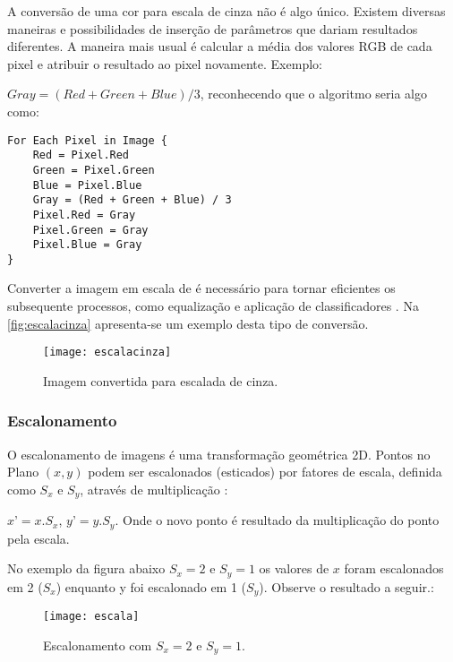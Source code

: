 A conversão de uma cor para escala de cinza não é algo único. Existem diversas maneiras e possibilidades de inserção de parâmetros que dariam resultados diferentes. A maneira mais usual é calcular a média dos valores RGB de cada pixel e atribuir o resultado ao pixel novamente. Exemplo:

$ Gray = (Red + Green + Blue) / 3 $, reconhecendo que o algoritmo seria algo como:

\begin{lstlisting}
For Each Pixel in Image {
	Red = Pixel.Red
	Green = Pixel.Green
	Blue = Pixel.Blue
	Gray = (Red + Green + Blue) / 3	
	Pixel.Red = Gray
	Pixel.Green = Gray
	Pixel.Blue = Gray
}
\end{lstlisting}



Converter a imagem em escala de é necessário para tornar eficientes os subsequente processos, como equalização e aplicação de classificadores \cite{drmathew_java_programming}. Na \autoref{fig:escalacinza} apresenta-se um exemplo desta tipo de conversão.

\begin{figure}[h]
	\centering
	\texttt{[image: escalacinza]}
	\caption{Imagem convertida para escalada de cinza.}
	\label{fig:escalacinza}
\end{figure}

\subsubsection{Escalonamento}\label{subsubsec:escalonamento}

O escalonamento de imagens é uma transformação geométrica 2D. Pontos no Plano $(x, y)$ podem ser escalonados (esticados) por fatores de escala, definida como $S_x$ e $S_y$, através de multiplicação \cite{lapix_escala}:

$ x’ = x . S_x $, $ y’ = y . S_y $.
Onde o novo ponto é resultado da multiplicação do ponto pela escala.

No exemplo da figura abaixo $S_x=2$ e $S_y=1$ os valores de $x$ foram escalonados em 2 ($ S_x $) enquanto y foi escalonado em 1 ($ S_y $). Observe o resultado a seguir.:

\begin{figure}[h]
	\centering
	\texttt{[image: escala]}
	\caption{Escalonamento com $S_x=2$ e $S_y=1$.}
	\label{fig:escala}
\end{figure}

